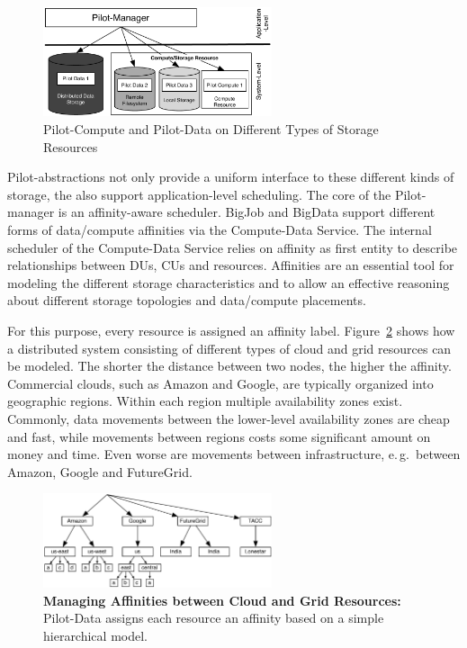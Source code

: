 \documentclass[times]{cpeauth}
\newcommand{\pilot}{Pilot\xspace}
\newcommand{\pilotdata}{Pilot-Data\xspace}
\newcommand{\computedataservice}{Compute-Data Service\xspace}
\newcommand{\dus}{DUs\xspace}
\newcommand{\cus}{CUs\xspace}
\begin{document}
\begin{figure}[t]
	\centering
		\includegraphics[width=0.6\textwidth]{figures/storage-types.pdf}
                \caption{Pilot-Compute and Pilot-Data on Different
                  Types of Storage Resources}
	\label{fig:figures_storage-types}
\end{figure}



\pilot-abstractions not only provide a uniform interface to these different
kinds of storage, the also support application-level scheduling. The core of
the \pilot-manager is an affinity-aware scheduler. BigJob and BigData support
different forms of data/compute affinities via the \computedataservice. The
internal scheduler of the \computedataservice relies on affinity as first
entity to describe relationships between \dus, \cus and resources. Affinities
are an essential tool for modeling the different storage characteristics and
to allow an effective reasoning about different storage topologies and
data/compute placements.

For this purpose, every resource is assigned an affinity label.
Figure~\ref{fig:figures_affinities} shows how a distributed system consisting
of different types of cloud and grid resources can be modeled. The shorter the 
distance between two nodes, the higher the affinity. Commercial clouds, such 
as Amazon and Google, are typically organized into geographic regions. Within 
each region multiple availability zones exist. Commonly, data movements 
between the lower-level availability zones are cheap and fast, while movements 
between regions costs some significant amount on money and time. Even worse 
are movements between infrastructure, e.\,g.\ between Amazon, Google and 
FutureGrid.


\begin{figure}[t]
	\centering
		\includegraphics[width=0.6\textwidth]{figures/affinities.pdf}
	\caption{\textbf{Managing Affinities between Cloud and Grid Resources:} \pilotdata assigns each resource an affinity based on a simple hierarchical model.}
	\label{fig:figures_affinities}
\end{figure}
\end{document}
